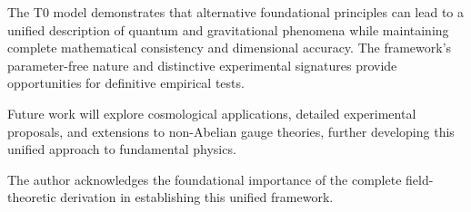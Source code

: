 \documentclass[twocolumn,aps,prl]{revtex4-2}
\begin{document}
	The T0 model demonstrates that alternative foundational principles can lead to a unified description of quantum and gravitational phenomena while maintaining complete mathematical consistency and dimensional accuracy. The framework's parameter-free nature and distinctive experimental signatures provide opportunities for definitive empirical tests.
	
	Future work will explore cosmological applications, detailed experimental proposals, and extensions to non-Abelian gauge theories, further developing this unified approach to fundamental physics.
	
	\begin{acknowledgments}
		The author acknowledges the foundational importance of the complete field-theoretic derivation in establishing this unified framework.
	\end{acknowledgments}
	
\end{document}
